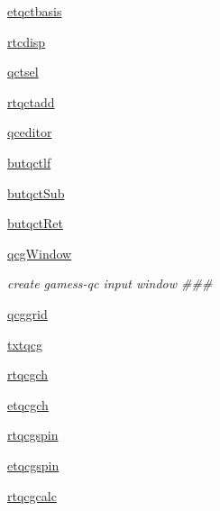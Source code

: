 \begin{DoxyCompactItemize}
\item 
\hyperlink{classmolSimplify_1_1Classes_1_1mGUI_1_1mGUI_a3718069d4f9403ee3304952e96508fd2}{etqctbasis}
\item 
\hyperlink{classmolSimplify_1_1Classes_1_1mGUI_1_1mGUI_a684ddbaad5fb0dbf717f694db04fe60d}{rtcdisp}
\item 
\hyperlink{classmolSimplify_1_1Classes_1_1mGUI_1_1mGUI_a691797dbe4eee1d693b796b71df9b90e}{qctsel}
\item 
\hyperlink{classmolSimplify_1_1Classes_1_1mGUI_1_1mGUI_ab0a9db432fc952510cc204e43d4b2d52}{rtqctadd}
\item 
\hyperlink{classmolSimplify_1_1Classes_1_1mGUI_1_1mGUI_a66587b558e3b5233f26944f1907dd856}{qceditor}
\item 
\hyperlink{classmolSimplify_1_1Classes_1_1mGUI_1_1mGUI_a1ebfb513572f78d829323520620f7a7b}{butqctlf}
\item 
\hyperlink{classmolSimplify_1_1Classes_1_1mGUI_1_1mGUI_aa435d51382a1b91f574aad194d0df025}{butqct\+Sub}
\item 
\hyperlink{classmolSimplify_1_1Classes_1_1mGUI_1_1mGUI_a647d9ce4f3c3d3dad8d0acea9ea66815}{butqct\+Ret}
\item 
\hyperlink{classmolSimplify_1_1Classes_1_1mGUI_1_1mGUI_a6834e00a97927388177e7f754dc68ab2}{qcg\+Window}
\begin{DoxyCompactList}\small\item\em create gamess-\/qc input window \#\#\# \end{DoxyCompactList}\item 
\hyperlink{classmolSimplify_1_1Classes_1_1mGUI_1_1mGUI_ac02f98f5f7a3640a717a70f535fb21b6}{qcggrid}
\item 
\hyperlink{classmolSimplify_1_1Classes_1_1mGUI_1_1mGUI_a510401d228f8862076d8f8322d7db599}{txtqcg}
\item 
\hyperlink{classmolSimplify_1_1Classes_1_1mGUI_1_1mGUI_ad99d05ab477314915f906a62d34c3384}{rtqcgch}
\item 
\hyperlink{classmolSimplify_1_1Classes_1_1mGUI_1_1mGUI_a554baa50e1271da2f53624b00ea5c20a}{etqcgch}
\item 
\hyperlink{classmolSimplify_1_1Classes_1_1mGUI_1_1mGUI_ad7e531870556c5852ebd4890e8fddcec}{rtqcgspin}
\item 
\hyperlink{classmolSimplify_1_1Classes_1_1mGUI_1_1mGUI_a02b3e097af82097db2ee479cf6543626}{etqcgspin}
\item 
\hyperlink{classmolSimplify_1_1Classes_1_1mGUI_1_1mGUI_a5bcefb1cc8280f32c86a4ab8fa4e50af}{rtqcgcalc}
\item 

\end{DoxyCompactItemize}
